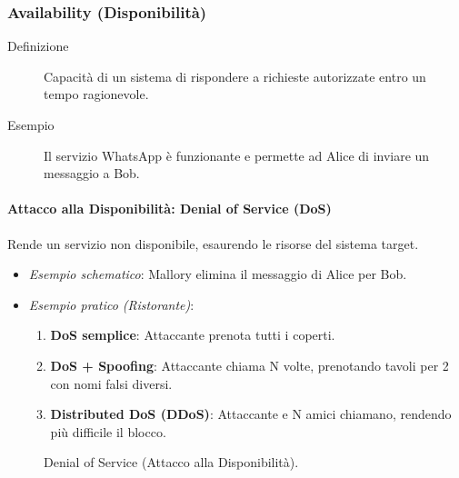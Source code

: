 \subsubsection{Availability (Disponibilità)}
\begin{description}
    \item[Definizione] Capacità di un sistema di rispondere a richieste autorizzate entro un tempo ragionevole.
    \item[Esempio] Il servizio WhatsApp è funzionante e permette ad Alice di inviare un messaggio a Bob.
\end{description}

\paragraph{Attacco alla Disponibilità: Denial of Service (DoS)}
Rende un servizio non disponibile, esaurendo le risorse del sistema target.
\begin{itemize}
    \item \textit{Esempio schematico}: Mallory elimina il messaggio di Alice per Bob.
    \item \textit{Esempio pratico (Ristorante)}:
    \begin{enumerate}
        \item \textbf{DoS semplice}: Attaccante prenota tutti i coperti.
        \item \textbf{DoS + Spoofing}: Attaccante chiama N volte, prenotando tavoli per 2 con nomi falsi diversi.
        \item \textbf{Distributed DoS (DDoS)}: Attaccante e N amici chiamano, rendendo più difficile il blocco.
    \end{enumerate}
\end{itemize}
\begin{figure}[H]
    \centering
    \caption{Denial of Service (Attacco alla Disponibilità).}
\end{figure}

